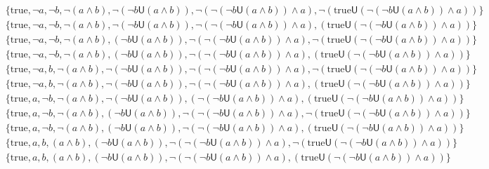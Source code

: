 $$
\begin{aligned}
& \{ \text{true}, \neg a, \neg b, \neg (a \wedge b), \neg (\neg b \mathsf{U} (a \wedge b)), \neg (\neg (\neg b \mathsf{U} (a \wedge b)) \wedge a), \neg (\text{true} \mathsf{U} (\neg (\neg b \mathsf{U} (a \wedge b)) \wedge a)) \} \\
& \{ \text{true}, \neg a, \neg b, \neg (a \wedge b), \neg (\neg b \mathsf{U} (a \wedge b)), \neg (\neg (\neg b \mathsf{U} (a \wedge b)) \wedge a), (\text{true} \mathsf{U} (\neg (\neg b \mathsf{U} (a \wedge b)) \wedge a)) \} \\
& \{ \text{true}, \neg a, \neg b, \neg (a \wedge b), (\neg b \mathsf{U} (a \wedge b)) , \neg (\neg (\neg b \mathsf{U} (a \wedge b)) \wedge a), \neg (\text{true} \mathsf{U} (\neg (\neg b \mathsf{U} (a \wedge b)) \wedge a)) \} \\
& \{ \text{true}, \neg a, \neg b, \neg (a \wedge b), (\neg b \mathsf{U} (a \wedge b)) , \neg (\neg (\neg b \mathsf{U} (a \wedge b)) \wedge a), (\text{true} \mathsf{U} (\neg (\neg b \mathsf{U} (a \wedge b)) \wedge a)) \} \\
& \{ \text{true}, \neg a, b , \neg (a \wedge b), \neg (\neg b \mathsf{U} (a \wedge b)), \neg (\neg (\neg b \mathsf{U} (a \wedge b)) \wedge a), \neg (\text{true} \mathsf{U} (\neg (\neg b \mathsf{U} (a \wedge b)) \wedge a)) \} \\
& \{ \text{true}, \neg a, b , \neg (a \wedge b), \neg (\neg b \mathsf{U} (a \wedge b)), \neg (\neg (\neg b \mathsf{U} (a \wedge b)) \wedge a), (\text{true} \mathsf{U} (\neg (\neg b \mathsf{U} (a \wedge b)) \wedge a)) \} \\
& \{ \text{true}, a , \neg b, \neg (a \wedge b), \neg (\neg b \mathsf{U} (a \wedge b)), (\neg (\neg b \mathsf{U} (a \wedge b)) \wedge a), (\text{true} \mathsf{U} (\neg (\neg b \mathsf{U} (a \wedge b)) \wedge a)) \} \\
& \{ \text{true}, a , \neg b, \neg (a \wedge b), (\neg b \mathsf{U} (a \wedge b)) , \neg (\neg (\neg b \mathsf{U} (a \wedge b)) \wedge a), \neg (\text{true} \mathsf{U} (\neg (\neg b \mathsf{U} (a \wedge b)) \wedge a)) \} \\
& \{ \text{true}, a , \neg b, \neg (a \wedge b), (\neg b \mathsf{U} (a \wedge b)) , \neg (\neg (\neg b \mathsf{U} (a \wedge b)) \wedge a), (\text{true} \mathsf{U} (\neg (\neg b \mathsf{U} (a \wedge b)) \wedge a)) \} \\
& \{ \text{true}, a , b , (a \wedge b) , (\neg b \mathsf{U} (a \wedge b)) , \neg (\neg (\neg b \mathsf{U} (a \wedge b)) \wedge a), \neg (\text{true} \mathsf{U} (\neg (\neg b \mathsf{U} (a \wedge b)) \wedge a)) \} \\
& \{ \text{true}, a , b , (a \wedge b) , (\neg b \mathsf{U} (a \wedge b)) , \neg (\neg (\neg b \mathsf{U} (a \wedge b)) \wedge a), (\text{true} \mathsf{U} (\neg (\neg b \mathsf{U} (a \wedge b)) \wedge a)) \} \\
\end{aligned}
$$

